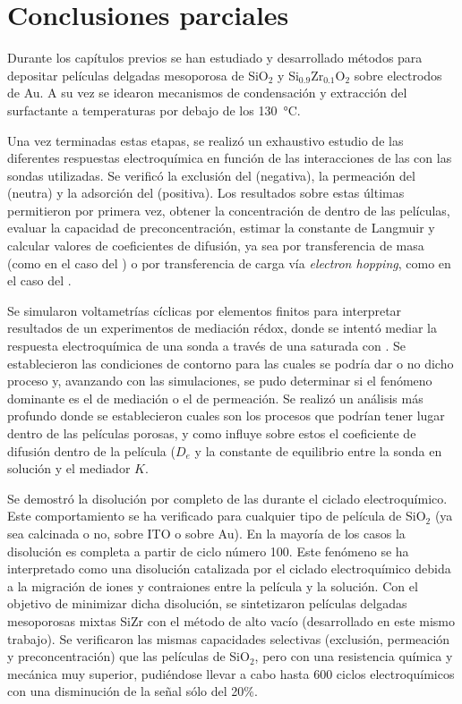 \section{Conclusiones parciales}
	
	Durante los capítulos previos se han estudiado y desarrollado métodos para depositar películas delgadas mesoporosa de SiO$_2$ y Si$_{0.9}$Zr$_{0.1}$O$_2$  sobre electrodos de Au. A su vez se idearon mecanismos de condensación y extracción del surfactante a temperaturas por debajo de los \SI{130}{\celsius}. 

	Una vez terminadas estas etapas, se realizó un exhaustivo estudio de las diferentes respuestas electroquímica en función de las interacciones de las \pdm\space con las sondas utilizadas. Se verificó la exclusión del \ferroferri\space (negativa), la permeación del \fc\space (neutra) y la adsorción del \aminorutenio\space (positiva). Los resultados sobre estas últimas permitieron por primera vez, obtener la concentración de \ru\space dentro de las películas, evaluar la capacidad de preconcentración, estimar la constante de Langmuir y calcular valores de coeficientes de difusión, ya sea por transferencia de masa (como en el caso del \fc) o por transferencia de carga vía \textit{electron hopping}, como en el caso del \ru.

	Se simularon voltametrías cíclicas por elementos finitos para interpretar resultados de un experimentos de mediación rédox, donde se intentó mediar la respuesta electroquímica de una sonda a través de una \pdm\space saturada con \ru. Se establecieron las condiciones de contorno para las cuales se podría dar o no dicho proceso y, avanzando con las simulaciones, se pudo determinar si el fenómeno dominante es el de mediación o el de permeación. Se realizó un análisis más profundo donde se establecieron cuales son los procesos que podrían tener lugar dentro de las películas porosas, y como influye sobre estos el coeficiente de difusión dentro de la película ($D_e$ y la constante de equilibrio entre la sonda en solución y el mediador $K$.

	Se demostró la disolución por completo de las \pdmF\space durante el ciclado electroquímico. Este comportamiento se ha verificado para cualquier tipo de película de SiO$_2$ (ya sea calcinada o no, sobre ITO o sobre Au). En la mayoría de los casos la disolución es completa a partir de ciclo número 100. Este fenómeno se ha interpretado como una disolución catalizada por el ciclado electroquímico debida a la migración de iones y contraiones entre la película y la solución. Con el objetivo de minimizar dicha disolución, se sintetizaron películas delgadas mesoporosas mixtas Si\textbar Zr con el método de alto vacío (desarrollado en este mismo trabajo). Se verificaron las mismas capacidades selectivas (exclusión, permeación y preconcentración) que las películas de SiO$_2$, pero con una resistencia química y mecánica muy superior, pudiéndose llevar a cabo hasta 600 ciclos electroquímicos con una disminución de la señal sólo del 20\%.

